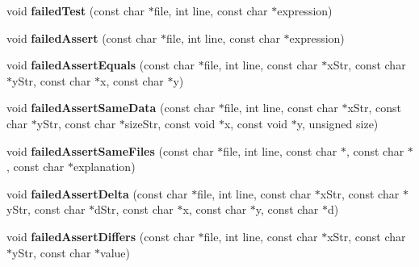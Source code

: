 \begin{DoxyCompactItemize}
\item 
\hypertarget{classCxxTest_1_1UNIXErrorFormatter_a761c879e925fe5ccef5387ae5a60842f}{void {\bfseries failed\-Test} (const char $\ast$file, int line, const char $\ast$expression)}\label{classCxxTest_1_1UNIXErrorFormatter_a761c879e925fe5ccef5387ae5a60842f}

\item 
\hypertarget{classCxxTest_1_1UNIXErrorFormatter_a9c617c3ce44aa233d8e611ee01424c79}{void {\bfseries failed\-Assert} (const char $\ast$file, int line, const char $\ast$expression)}\label{classCxxTest_1_1UNIXErrorFormatter_a9c617c3ce44aa233d8e611ee01424c79}

\item 
\hypertarget{classCxxTest_1_1UNIXErrorFormatter_ae93b5175ed23b51ca16db02e44f0b75a}{void {\bfseries failed\-Assert\-Equals} (const char $\ast$file, int line, const char $\ast$x\-Str, const char $\ast$y\-Str, const char $\ast$x, const char $\ast$y)}\label{classCxxTest_1_1UNIXErrorFormatter_ae93b5175ed23b51ca16db02e44f0b75a}

\item 
\hypertarget{classCxxTest_1_1UNIXErrorFormatter_a9390e2229b54aa9c488e69c9f4208aec}{void {\bfseries failed\-Assert\-Same\-Data} (const char $\ast$file, int line, const char $\ast$x\-Str, const char $\ast$y\-Str, const char $\ast$size\-Str, const void $\ast$x, const void $\ast$y, unsigned size)}\label{classCxxTest_1_1UNIXErrorFormatter_a9390e2229b54aa9c488e69c9f4208aec}

\item 
\hypertarget{classCxxTest_1_1UNIXErrorFormatter_a81a13635d50323a009bc9cc5ec955fb8}{void {\bfseries failed\-Assert\-Same\-Files} (const char $\ast$file, int line, const char $\ast$, const char $\ast$, const char $\ast$explanation)}\label{classCxxTest_1_1UNIXErrorFormatter_a81a13635d50323a009bc9cc5ec955fb8}

\item 
\hypertarget{classCxxTest_1_1UNIXErrorFormatter_a2e441216b1cb66b427c2a7a6aba3b1c4}{void {\bfseries failed\-Assert\-Delta} (const char $\ast$file, int line, const char $\ast$x\-Str, const char $\ast$y\-Str, const char $\ast$d\-Str, const char $\ast$x, const char $\ast$y, const char $\ast$d)}\label{classCxxTest_1_1UNIXErrorFormatter_a2e441216b1cb66b427c2a7a6aba3b1c4}

\item 
\hypertarget{classCxxTest_1_1UNIXErrorFormatter_a43cf8db0bc6d8cbd126121ec5c40467f}{void {\bfseries failed\-Assert\-Differs} (const char $\ast$file, int line, const char $\ast$x\-Str, const char $\ast$y\-Str, const char $\ast$value)}\label{classCxxTest_1_1UNIXErrorFormatter_a43cf8db0bc6d8cbd126121ec5c40467f}


\end{DoxyCompactItemize}
